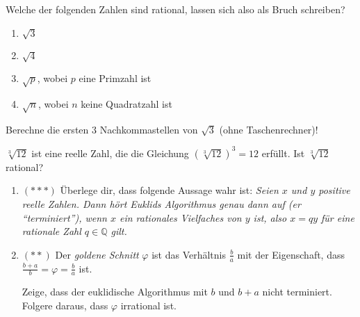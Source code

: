 \documentclass{zusammenfassung}
\begin{document}
\begin{aufgabe}
	Welche der folgenden Zahlen sind rational, lassen sich also als Bruch schreiben?
	\begin{enumerate}
		\item $\sqrt 3$
		\item $\sqrt 4$
		\item $\sqrt p$, wobei $p$ eine Primzahl ist
		\item $\sqrt n$, wobei $n$ keine Quadratzahl ist
	\end{enumerate}
\end{aufgabe}

\begin{aufgabe}[$(*)$]
	Berechne die ersten $3$ Nachkommastellen von $\sqrt 3$ (ohne Taschenrechner)!
\end{aufgabe}

\begin{aufgabe}
	$\sqrt[3]{12}$ ist eine reelle Zahl, die die Gleichung $(\sqrt[3]{12})^3=12$ erfüllt. Ist $\sqrt[3]{12}$ rational?
\end{aufgabe}

\def\phi{\varphi}

\begin{aufgabe}
	\begin{enumerate} 
		\item $(***)$ Überlege dir, dass folgende Aussage wahr ist: \emph{Seien $x$ und $y$ positive reelle Zahlen. Dann hört Euklids
				Algorithmus genau dann auf (er "`terminiert"'), wenn $x$ ein rationales Vielfaches von $y$ ist, also $x=qy$ für eine
			rationale Zahl $q\in\mathbb Q$ gilt.}
		\item $(**)$ Der \emph{goldene Schnitt} $\phi$ ist das Verhältnis $\frac ba$ mit der Eigenschaft, dass $\frac{b+a}b=\phi=\frac
			ba$ ist.
			\begin{center}
			\end{center}
			Zeige, dass der euklidische Algorithmus mit $b$ und $b+a$ nicht terminiert. Folgere daraus, dass $\phi$ irrational ist.
	\end{enumerate}
\end{aufgabe}
\end{document}
